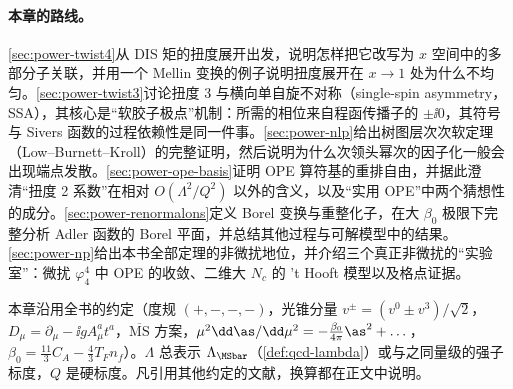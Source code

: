 \paragraph{本章的路线。}
\cref{sec:power-twist4}从 DIS 矩的扭度展开出发，说明怎样把它改写为 $x$ 空间中的多部分子关联，并用一个 Mellin 变换的例子说明扭度展开在 $x\to1$ 处为什么不均匀。\cref{sec:power-twist3}讨论扭度 3 与横向单自旋不对称（single-spin asymmetry，SSA），其核心是“软胶子极点”机制：所需的相位来自程函传播子的 $\pm\ii0$，其符号与 Sivers 函数的过程依赖性是同一件事。\cref{sec:power-nlp}给出树图层次次软定理（Low--Burnett--Kroll）的完整证明，然后说明为什么次领头幂次的因子化一般会出现端点发散。\cref{sec:power-ope-basis}证明 OPE 算符基的重排自由，并据此澄清“扭度 2 系数”在相对 $O(\Lambda^2/Q^2)$ 以外的含义，以及“实用 OPE”中两个猜想性的成分。\cref{sec:power-renormalons}定义 Borel 变换与重整化子，在大 $\beta_0$ 极限下完整分析 Adler 函数的 Borel 平面，并总结其他过程与可解模型中的结果。\cref{sec:power-np}给出本书全部定理的非微扰地位，并介绍三个真正非微扰的“实验室”：微扰 $\varphi^4_4$ 中 OPE 的收敛、二维大 $N_c$ 的 't Hooft 模型以及格点证据。

本章沿用全书的约定（度规 $(+,-,-,-)$，光锥分量 $v^\pm=(v^0\pm v^3)/\sqrt2$，$D_\mu=\partial_\mu-\ii gA_\mu^at^a$，$\overline{\mathrm{MS}}$ 方案，$\mu^2\dd\as/\dd\mu^2=-\frac{\beta_0}{4\pi}\as^2+\dots$，$\beta_0=\frac{11}{3}C_A-\frac43T_Fn_f$）。$\Lambda$ 总表示 $\Lambda_{\MSbar}$（\cref{def:qcd-lambda}）或与之同量级的强子标度，$Q$ 是硬标度。凡引用其他约定的文献，换算都在正文中说明。

